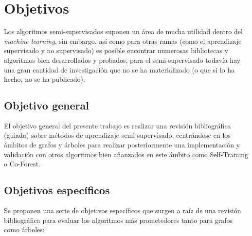 
\cleardoublepage

\chapter{Objetivos}
\label{objetivos}

Los algoritmos semi-supervisados suponen un área de mucha utilidad dentro del \textit{machine learning}, sin embargo, así como para otras ramas (como el aprendizaje supervisado y no supervisado) es posible encontrar numerosas bibliotecas y algoritmos bien desarrollados y probados, para el semi-supervisado todavía hay una gran cantidad de investigación que no se ha materializado (o que si lo ha hecho, no se ha publicado).

\section{Objetivo general}

El objetivo general del presente trabajo es realizar una revisión bibliográfica (guiada) sobre métodos de aprendizaje semi-supervisado, centrándose en los ámbitos de grafos y árboles para realizar posteriormente una implementación y validación con otros algoritmos bien afianzados en este ámbito como Self-Training o Co-Forest.

\medskip

\section{Objetivos específicos}

Se proponen una serie de objetivos específicos que surgen a raíz de una revisión bibliográfica para evaluar los algoritmos más prometedores tanto para grafos como árboles:

